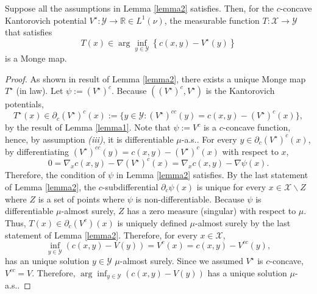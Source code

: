 \begin{theorem} \label{thm:generalized}
    Suppose all the assumptions in Lemma \ref{lemma2} satisfies. Then, for the $c$-concave Kantorovich potential $V^\star:\mathcal{Y}\rightarrow \mathbb{R} \in L^1(\nu)$, the measurable function $T:\mathcal{X}\rightarrow \mathcal{Y}$ that satisfies
    \begin{equation}
        T(x) \in \arg\inf_{y\in\mathcal{Y}} \left\{ c(x,y) - V^\star(y) \right\}
    \end{equation}
    is a Monge map.
\end{theorem}
\begin{proof}
As shown in result of Lemma \ref{lemma2}, there exists a unique Monge map $T^\star$ (in law).
Let $\psi := (V^\star)^c$. Because $((V^\star)^c, V^\star)$ is the Kantorovich potentials, 
\begin{equation} \label{eq:c-subdifferential}
    T^\star(x) \in \partial_c (V^\star)^c (x) := \{ y\in \mathcal{Y} : (V^\star)^{cc}(y) = c(x,y) - (V^\star)^c (x) \},
\end{equation}
by the result of Lemma \ref{lemma1}.
Note that $\psi := V^c$ is a $c$-concave function, hence, by assumption \textit{(iii)}, it is differentiable $\mu$-a.s.. For every $y\in \partial_c (V^\star)^c (x)$, by differentiating $(V^\star)^{cc}(y) = c(x,y) - (V^\star)^c (x)$ with respect to $x$,
\begin{equation}
    0 = \nabla_x c(x, y) - \nabla (V^\star)^c(x) = \nabla_x c(x, y) - \nabla \psi(x).
\end{equation}
Therefore, the condition of $\psi$ in Lemma \ref{lemma2} satisfies.
By the last statement of Lemma \ref{lemma2}, the $c$-subdifferential $\partial_c \psi(x)$ is unique for every $x\in \mathcal{X}\backslash Z$ where $Z$ is a set of points where $\psi$ is non-differentiable. Because $\psi$ is differentiable $\mu$-almost surely, $Z$ has a zero measure (singular) with respect to $\mu$. Thus, $T(x) \in \partial_c (V^c)(x)$ is uniquely defined $\mu$-almost surely by the last statement of Lemma \ref{lemma2}.
Therefore, for every $x\in \mathcal{X}$,
\begin{equation} \label{eq:final_eq_for_proof}
    \inf_{y\in\mathcal{Y}} \left( c(x,y) - V(y) \right) = V^c(x) = c(x,y) - V^{cc}(y),
\end{equation}
has an unique solution $y\in\mathcal{Y}$ $\mu$-almost surely. Since we assumed $V^\star$ is $c$-concave, $V^{cc} = V$. Therefore, $\arg\inf_{y\in\mathcal{Y}} \left( c(x,y) - V(y) \right)$ has a unique solution $\mu$-a.s..
\end{proof}

